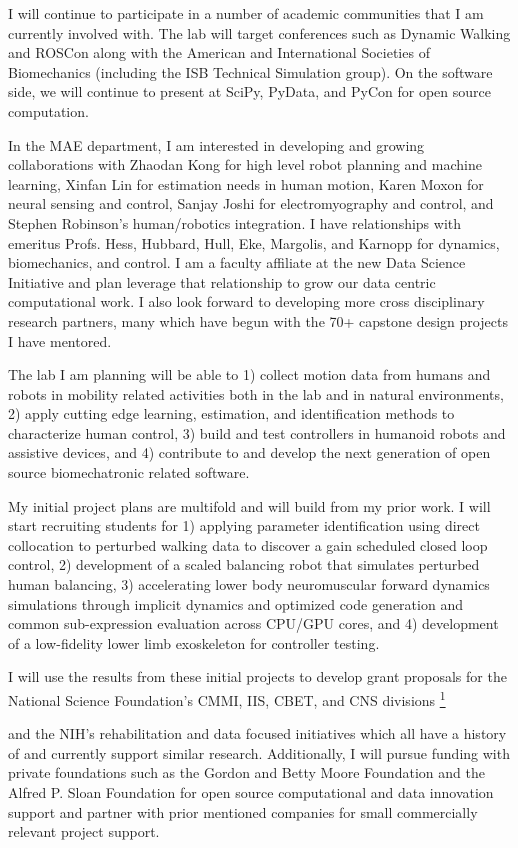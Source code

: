 \documentclass[letter]{article}
\providecommand*{\DUfootnotemark}[3]{%
  \raisebox{1em}{\hypertarget{#1}{}}%
  \hyperlink{#2}{\textsuperscript{#3}}%
}
\begin{document}
I will continue to participate in a number of academic communities that I am
currently involved with. The lab will target conferences such as Dynamic
Walking and ROSCon along with the American and International Societies of
Biomechanics (including the ISB Technical Simulation group). On the software
side, we will continue to present at SciPy, PyData, and PyCon for open source
computation.

In the MAE department, I am interested in developing and growing collaborations
with Zhaodan Kong for high level robot planning and machine learning, Xinfan
Lin for estimation needs in human motion, Karen Moxon for neural sensing and
control, Sanjay Joshi for electromyography and control, and Stephen Robinson's
human/robotics integration. I have relationships with emeritus Profs. Hess,
Hubbard, Hull, Eke, Margolis, and Karnopp for dynamics, biomechanics, and
control. I am a faculty affiliate at the new Data Science Initiative and plan
leverage that relationship to grow our data centric computational work. I also
look forward to developing more cross disciplinary research partners, many which
have begun with the 70+ capstone design projects I have mentored.

The lab I am planning will be able to 1) collect motion data from humans and
robots in mobility related activities both in the lab and in natural
environments, 2) apply cutting edge learning, estimation, and identification
methods to characterize human control, 3) build and test controllers in
humanoid robots and assistive devices, and 4) contribute to and develop the
next generation of open source biomechatronic related software.

My initial project plans are multifold and will build from my prior work. I
will start recruiting students for 1) applying parameter identification using
direct collocation to perturbed walking data to discover a gain scheduled
closed loop control, 2) development of a scaled balancing robot that simulates
perturbed human balancing, 3) accelerating lower body neuromuscular forward
dynamics simulations through implicit dynamics and optimized code generation
and common sub-expression evaluation across CPU/GPU cores, and 4) development
of a low-fidelity lower limb exoskeleton for controller testing.

I will use the results from these initial projects to develop grant proposals
for the National Science Foundation's CMMI, IIS, CBET, and CNS divisions\DUfootnotemark{id53}{id54}{1}
and the NIH's rehabilitation and data focused initiatives which all have a
history of and currently support similar research. Additionally, I will pursue
funding with private foundations such as the Gordon and Betty Moore Foundation
and the Alfred P. Sloan Foundation for open source computational and data
innovation support and partner with prior mentioned companies for small
commercially relevant project support.
\end{document}
